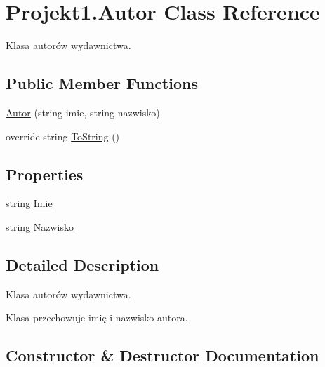 \hypertarget{class_projekt1_1_1_autor}{}\section{Projekt1.\+Autor Class Reference}
\label{class_projekt1_1_1_autor}


Klasa autorów wydawnictwa.  


\subsection*{Public Member Functions}
\begin{DoxyCompactItemize}
\item 
\mbox{\hyperlink{class_projekt1_1_1_autor_a9fc5d2b4628108a5c75349fd3528de56}{Autor}} (string imie, string nazwisko)
\item 
override string \mbox{\hyperlink{class_projekt1_1_1_autor_a3457cce4f59d68c68690555f0976c843}{To\+String}} ()
\end{DoxyCompactItemize}
\subsection*{Properties}
\begin{DoxyCompactItemize}
\item 
string \mbox{\hyperlink{class_projekt1_1_1_autor_a029059f6256a8051c736f9a74843c36e}{Imie}}
\item 
string \mbox{\hyperlink{class_projekt1_1_1_autor_a51dfb5d0551e89c9149e32389c592b7c}{Nazwisko}}
\end{DoxyCompactItemize}


\subsection{Detailed Description}
Klasa autorów wydawnictwa. 

Klasa przechowuje imię i nazwisko autora. 

\subsection{Constructor \& Destructor Documentation}
\mbox{\label{class_projekt1_1_1_autor_a9fc5d2b4628108a5c75349fd3528de56}} 

